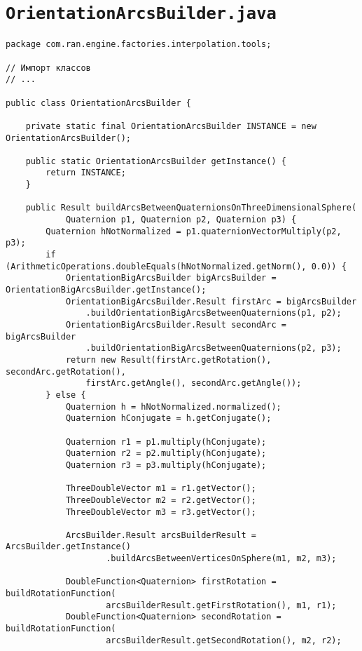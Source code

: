 \section*{\texttt{OrientationArcsBuilder.java}}
\begin{verbatim}
package com.ran.engine.factories.interpolation.tools;

// Импорт классов
// ...

public class OrientationArcsBuilder {

    private static final OrientationArcsBuilder INSTANCE = new OrientationArcsBuilder();

    public static OrientationArcsBuilder getInstance() {
        return INSTANCE;
    }

    public Result buildArcsBetweenQuaternionsOnThreeDimensionalSphere(
            Quaternion p1, Quaternion p2, Quaternion p3) {
        Quaternion hNotNormalized = p1.quaternionVectorMultiply(p2, p3);
        if (ArithmeticOperations.doubleEquals(hNotNormalized.getNorm(), 0.0)) {
            OrientationBigArcsBuilder bigArcsBuilder = OrientationBigArcsBuilder.getInstance();
            OrientationBigArcsBuilder.Result firstArc = bigArcsBuilder
                .buildOrientationBigArcsBetweenQuaternions(p1, p2);
            OrientationBigArcsBuilder.Result secondArc = bigArcsBuilder
                .buildOrientationBigArcsBetweenQuaternions(p2, p3);
            return new Result(firstArc.getRotation(), secondArc.getRotation(),
                firstArc.getAngle(), secondArc.getAngle());
        } else {
            Quaternion h = hNotNormalized.normalized();
            Quaternion hConjugate = h.getConjugate();

            Quaternion r1 = p1.multiply(hConjugate);
            Quaternion r2 = p2.multiply(hConjugate);
            Quaternion r3 = p3.multiply(hConjugate);

            ThreeDoubleVector m1 = r1.getVector();
            ThreeDoubleVector m2 = r2.getVector();
            ThreeDoubleVector m3 = r3.getVector();

            ArcsBuilder.Result arcsBuilderResult = ArcsBuilder.getInstance()
                    .buildArcsBetweenVerticesOnSphere(m1, m2, m3);

            DoubleFunction<Quaternion> firstRotation = buildRotationFunction(
                    arcsBuilderResult.getFirstRotation(), m1, r1);
            DoubleFunction<Quaternion> secondRotation = buildRotationFunction(
                    arcsBuilderResult.getSecondRotation(), m2, r2);


\end{verbatim}
